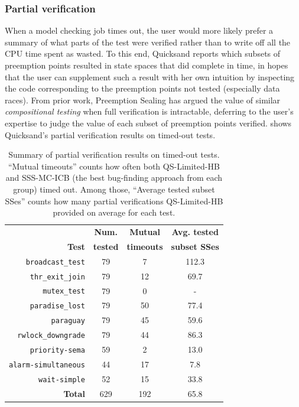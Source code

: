 \subsubsection{Partial verification}
\label{sec:quicksand-eval-partial}

When a model checking job times out,
the user would more likely prefer a summary of what parts of the test were verified
rather than to write off all the CPU time spent as wasted.
To this end,
Quicksand
reports which subsets of preemption points resulted in state spaces that did complete in time,
in hopes that the user can supplement such a result with her own intuition
by inspecting the code corresponding to the preemption points not tested (especially data races).
From prior work, Preemption Sealing \cite{sealing}
has argued the value of similar {\em compositional testing} when full verification is intractable,
deferring to the user's expertise to judge the value of each subset of preemption points verified.
 shows Quicksand's partial verification results on timed-out tests.

\begin{table}[h]
	\begin{center}
	\small
	\begin{tabular}{r|c||c|c}
		& {\bf Num.} & {\bf Mutual} & {\bf Avg. tested} \\
		{\bf Test} & {\bf tested} & {\bf timeouts} & {\bf subset SSes} \\
		\hline
		{\tt broadcast\_test}    & 79  & 7    & 112.3 \\
		{\tt thr\_exit\_join}    & 79  & {12} & {69.7} \\
		{\tt mutex\_test}        & 79  & 0    & -     \\
		{\tt paradise\_lost}     & 79  & {50} & {77.4} \\
		{\tt paraguay}           & 79  & 45   & {59.6} \\
		{\tt rwlock\_downgrade}  & 79  & {44} & {86.3} \\
		\hline
		{\tt priority-sema}      & 59  & 2    & 13.0  \\
		{\tt alarm-simultaneous} & 44  & {17} & {7.8}  \\
		{\tt wait-simple}        & 52  & {15} & {33.8} \\
		\hline
		{\bf Total}              & 629 & {192}& {65.8} \\
	\end{tabular}
	\end{center}
	\caption[Summary of partial verification results on timed-out tests.]
	{Summary of partial verification results on timed-out tests.
	``Mutual timeouts'' counts how often both QS-Limited-HB and SSS-MC-ICB
	(the best bug-finding approach from each group)
	timed out. %
	Among those, ``Average tested subset SSes'' counts how many partial verifications
	QS-Limited-HB provided on average for each test. %
	}
	\label{tab:partialverifs}
\end{table}


